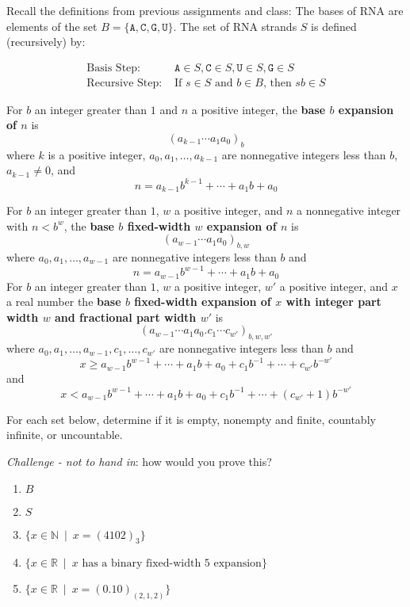 \documentclass[12pt, oneside]{article}
\newcommand{\A}[0]{\texttt{A}}
\newcommand{\C}[0]{\texttt{C}}
\newcommand{\G}[0]{\texttt{G}}
\newcommand{\U}[0]{\texttt{U}}
\begin{document}
\begin{enumerate}
Recall the definitions from previous assignments and class: 
The bases of RNA are elements of the set 
$B  = \{\A, \C, \G, \U \}$. The set of RNA strands $S$ is defined (recursively) by:

\[
\begin{array}{ll}
\textrm{Basis Step: } & \A \in S, \C \in S, \U \in S, \G \in S \\
\textrm{Recursive Step: } & \textrm{If } s \in S\textrm{ and }b \in B \textrm{, then }sb \in S
\end{array}
\]

For $b$ an integer greater than $1$ and $n$ a positive integer, 
the {\bf base $b$ expansion of $n$}  is
\[
(a_{k-1} \cdots a_1 a_0)_b
\]
where $k$ is a positive integer, $a_0, a_1, \ldots, a_{k-1}$ are nonnegative integers less than $b$, $a_{k-1} \neq  0$, and
\[
n =  a_{k-1} b^{k-1} + \cdots + a_1b + a_0
\]

For $b$ an integer greater than $1$, $w$ a positive integer, and $n$ a nonnegative integer
with $n < b^w$,
the {\bf base $b$ fixed-width $w$ expansion of $n$}  is
\[
(a_{w-1} \cdots a_1 a_0)_{b,w}
\]
where  $a_0, a_1, \ldots, a_{w-1}$ are nonnegative integers less than $b$ and
\[
n =  a_{w-1} b^{w-1} + \cdots + a_1b + a_0
\]
For $b$ an integer greater than $1$, $w$ a positive integer, $w'$ a positive  integer, and $x$ a real number
the {\bf base $b$ fixed-width expansion of $x$ with integer part width $w$  and fractional part width $w'$} is
\[
(a_{w-1} \cdots a_1 a_0 .  c_{1} \cdots c_{w'})_{b,w,w'}
\]
where  $a_0, a_1, \ldots, a_{w-1}, c_1, \ldots, c_{w'}$ are nonnegative integers less than $b$ and
$$x \geq a_{w-1} b^{w-1} +  \cdots + a_1 b + a_0 +  c_{1} b^{-1} + \cdots +  c_{w'} b^{-w'}$$
and
$$x < a_{w-1} b^{w-1} +  \cdots + a_1 b + a_0 +  c_{1} b^{-1} + \cdots +  (c_{w'} +1) b^{-w'}$$


For each set below, determine if it is empty, nonempty and finite, countably infinite, or uncountable.

{\it Challenge - not to hand in}: how would you prove this?

\begin{enumerate}
\item $B$
\item $S$
\item $\{ x \in \mathbb{N} ~\mid~ x = (4102)_3 \}$
\item $\{ x \in \mathbb{R} ~\mid~ \text{$x$ has a binary fixed-width $5$ expansion} \}$
\item $\{ x \in \mathbb{R} ~\mid~ x = (0.10)_{(2,1,2)} \}$
\end{enumerate} \end{enumerate}
\end{document}
